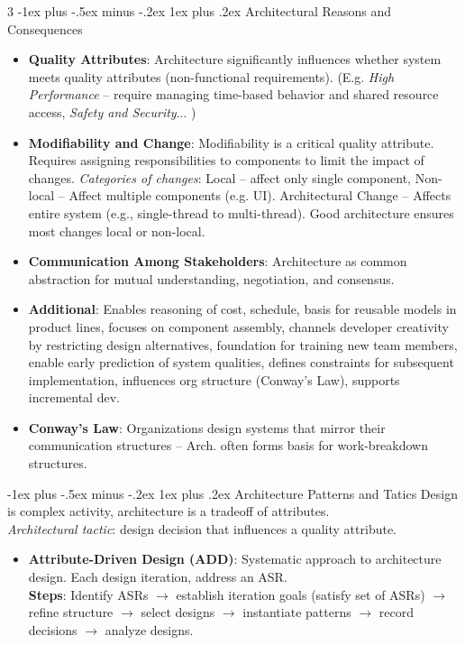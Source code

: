 \documentclass[a4paper, 10pt, landscape]{article}
\makeatletter
\renewcommand{\subsubsection}{\@startsection{subsubsection}{3}{0mm}%
                                {-1ex plus -.5ex minus -.2ex}%
                                {1ex plus .2ex}%
                                {\normalfont\small\bfseries}}
\makeatother
\begin{document}
\begin{multicols*}{3}
\subsubsection{Architectural Reasons and Consequences}
\begin{itemize}
    \item \textbf{Quality Attributes}: Architecture significantly influences whether system meets quality attributes (non-functional requirements). (E.g. \textit{High Performance} -- require managing time-based behavior and shared resource access, \textit{Safety and Security}... )
    \item \textbf{Modifiability and Change}: Modifiability is a critical quality attribute. Requires assigning responsibilities to components to limit the impact of changes.
    \textit{Categories of changes}: Local -- affect only single component, Non-local -- Affect multiple components (e.g. UI). Architectural Change -- Affects entire system (e.g., single-thread to multi-thread). Good architecture ensures most changes local or non-local.
    \item \textbf{Communication Among Stakeholders}: Architecture as common abstraction for mutual understanding, negotiation, and consensus.
    \item \textbf{Additional}: Enables reasoning of cost, schedule, basis for reusable models in product lines, focuses on component assembly, channels developer creativity by restricting design alternatives, foundation for training new team members, enable early prediction of system qualities, defines constraints for subsequent implementation, influences org structure (Conway’s Law), supports incremental dev.
    \item \textbf{Conway’s Law}: Organizations design systems that mirror their communication structures -- Arch. often forms basis for work-breakdown structures.
\end{itemize}

\subsubsection{Architecture Patterns and Tatics}
Design is complex activity, architecture is a tradeoff of attributes. \\
\textit{Architectural tactic}: design decision that influences a quality attribute.
\begin{itemize}
\item \textbf{Attribute-Driven Design (ADD)}: Systematic approach to architecture design. Each design iteration, address an ASR. \\
\textbf{Steps}: Identify ASRs $\rightarrow$ establish iteration goals (satisfy set of ASRs) $\rightarrow$ refine structure $\rightarrow$ select designs $\rightarrow$ instantiate patterns $\rightarrow$ record decisions $\rightarrow$ analyze designs.
\end{itemize}


\end{multicols*}
\end{document}
